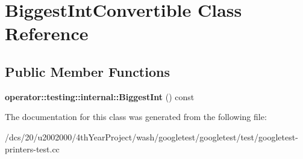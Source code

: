 \hypertarget{classBiggestIntConvertible}{}\section{Biggest\+Int\+Convertible Class Reference}
\label{classBiggestIntConvertible}
\subsection*{Public Member Functions}
\begin{DoxyCompactItemize}
\item 
\mbox{\label{classBiggestIntConvertible_aa3dc4bbff87d412758b9adbefa19c6d0}} 
{\bfseries operator\+::testing\+::internal\+::\+Biggest\+Int} () const
\end{DoxyCompactItemize}


The documentation for this class was generated from the following file\+:\begin{DoxyCompactItemize}
\item 
/dcs/20/u2002000/4th\+Year\+Project/wash/googletest/googletest/test/googletest-\/printers-\/test.\+cc\end{DoxyCompactItemize}
